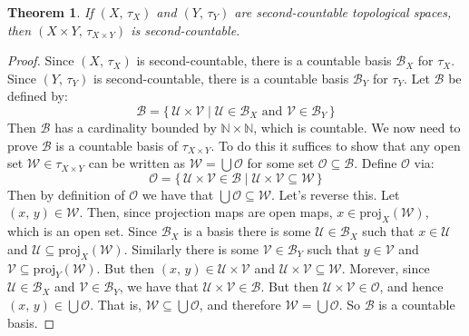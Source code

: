 \documentclass{article}
\theoremstyle{plain}
\newtheorem{theorem}{Theorem}[section]
\theoremstyle{normal}
\begin{document}
        \begin{theorem}
            If $(X,\,\tau_{X})$ and $(Y,\,\tau_{Y})$ are second-countable
            topological spaces, then $(X\times{Y},\,\tau_{X\times{Y}})$ is
            second-countable.
        \end{theorem}
        \begin{proof}
            Since $(X,\,\tau_{X})$ is second-countable, there is a countable
            basis $\mathcal{B}_{X}$ for $\tau_{X}$. Since $(Y,\,\tau_{Y})$ is
            second-countable, there is a countable basis $\mathcal{B}_{Y}$ for
            $\tau_{Y}$. Let $\mathcal{B}$ be defined by:
            \begin{equation}
                \mathcal{B}=
                    \{\,\mathcal{U}\times\mathcal{V}\;|\;
                    \mathcal{U}\in\mathcal{B}_{X}\textrm{ and }
                    \mathcal{V}\in\mathcal{B}_{Y}\,\}
            \end{equation}
            Then $\mathcal{B}$ has a cardinality bounded by
            $\mathbb{N}\times\mathbb{N}$, which is countable. We now need to
            prove $\mathcal{B}$ is a countable basis of $\tau_{X\times{Y}}$.
            To do this it suffices to show that
            any open set $\mathcal{W}\in\tau_{X\times{Y}}$ can be written
            as $\mathcal{W}=\bigcup\mathcal{O}$ for some set
            $\mathcal{O}\subseteq\mathcal{B}$. Define $\mathcal{O}$ via:
            \begin{equation}
                \mathcal{O}=
                \{\,\mathcal{U}\times\mathcal{V}\in\mathcal{B}\;|\;
                    \mathcal{U}\times\mathcal{V}\subseteq\mathcal{W}\,\}
            \end{equation}
            Then by definition of $\mathcal{O}$ we have that
            $\bigcup\mathcal{O}\subseteq\mathcal{W}$. Let's reverse this.
            Let $(x,\,y)\in\mathcal{W}$. Then, since projection maps are open
            maps, $x\in\textrm{proj}_{X}(\mathcal{W})$, which is an open set.
            Since $\mathcal{B}_{X}$ is a basis there is some
            $\mathcal{U}\in\mathcal{B}_{X}$ such that $x\in\mathcal{U}$ and
            $\mathcal{U}\subseteq\textrm{proj}_{X}(\mathcal{W})$. Similarly
            there is some $\mathcal{V}\in\mathcal{B}_{Y}$ such that
            $y\in\mathcal{V}$ and
            $\mathcal{V}\subseteq\textrm{proj}_{Y}(\mathcal{W})$. But then
            $(x,\,y)\in\mathcal{U}\times\mathcal{V}$ and
            $\mathcal{U}\times\mathcal{V}\subseteq\mathcal{W}$. Morever, since
            $\mathcal{U}\in\mathcal{B}_{X}$ and $\mathcal{V}\in\mathcal{B}_{Y}$,
            we have that $\mathcal{U}\times\mathcal{V}\in\mathcal{B}$. But
            then $\mathcal{U}\times\mathcal{V}\in\mathcal{O}$, and hence
            $(x,\,y)\in\bigcup\mathcal{O}$. That is,
            $\mathcal{W}\subseteq\bigcup\mathcal{O}$, and therefore
            $\mathcal{W}=\bigcup\mathcal{O}$. So $\mathcal{B}$ is a countable
            basis.
        \end{proof}
\end{document}
